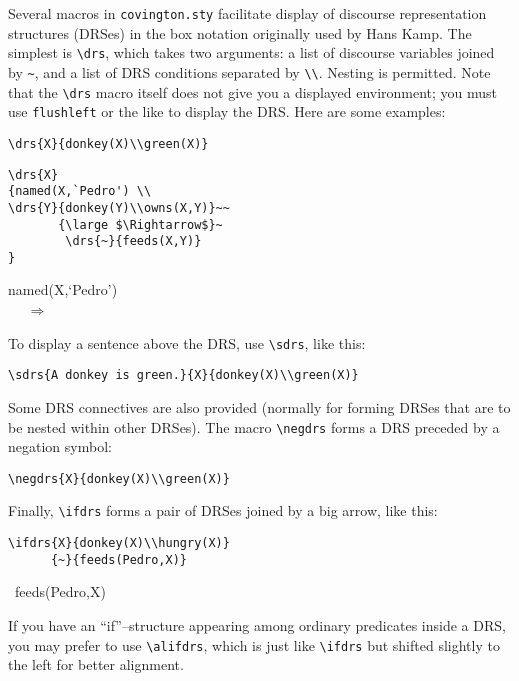 \documentclass{article}
\begin{document}
Several macros in \texttt{covington.sty} facilitate display of discourse 
representation structures (DRSes) in the box notation originally used by 
Hans Kamp.  The simplest is \verb"\drs", which takes two arguments:
a list of discourse variables joined by \verb"~", and a list of DRS 
conditions separated by \verb"\\".  Nesting is permitted.  Note that the 
\verb"\drs" macro itself does not give you a displayed environment; you 
must use \texttt{flushleft} or the like to display the DRS.
Here are some examples:
\begin{verbatim}
\drs{X}{donkey(X)\\green(X)}
\end{verbatim}
\begin{flushleft}
\end{flushleft}
\begin{verbatim}
\drs{X}
{named(X,`Pedro') \\
\drs{Y}{donkey(Y)\\owns(X,Y)}~~
       {\large $\Rightarrow$}~
        \drs{~}{feeds(X,Y)}
}
\end{verbatim}
\begin{flushleft}
{named(X,`Pedro') \\
~~
       {\large $\Rightarrow$}~
}
\end{flushleft}
To display a sentence above the DRS, use \verb"\sdrs", like this:
\begin{verbatim}
\sdrs{A donkey is green.}{X}{donkey(X)\\green(X)}
\end{verbatim}
\begin{flushleft}
\end{flushleft}
Some DRS connectives are also provided (normally for forming
DRSes that are to be nested within other DRSes).
The macro \verb"\negdrs" forms a DRS preceded by a negation symbol:
\begin{verbatim}
\negdrs{X}{donkey(X)\\green(X)}
\end{verbatim}
\begin{flushleft}
\end{flushleft}
Finally, \verb"\ifdrs" forms a pair of DRSes joined by a big arrow,
like this:
\begin{verbatim}
\ifdrs{X}{donkey(X)\\hungry(X)}
      {~}{feeds(Pedro,X)}
\end{verbatim}
\begin{flushleft}
      {~}{feeds(Pedro,X)}
\end{flushleft}
If you have an ``if''--structure appearing among ordinary predicates 
inside a DRS, you may prefer to use \verb"\alifdrs", which is just like 
\verb"\ifdrs" but shifted slightly to the left for better alignment.
\end{document}
